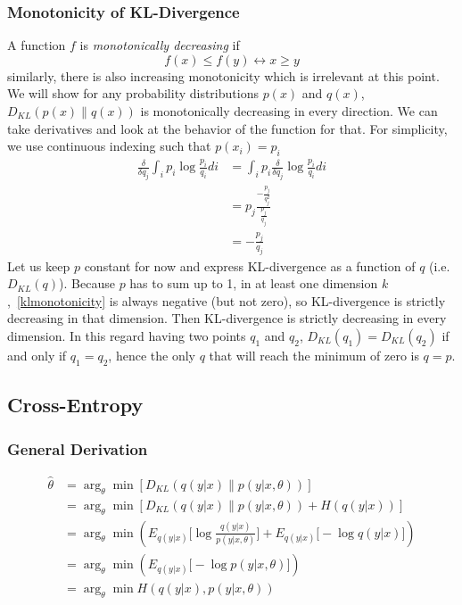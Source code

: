 \documentclass{book}
\numberwithin{equation}{subsection}
\begin{document}
\subsubsection{Monotonicity of KL-Divergence}
A function $f$ is \textit{monotonically decreasing} if
\begin{equation}
    f(x) \leq f(y) \longleftrightarrow x \geq y
\end{equation}
similarly, there is also increasing monotonicity which is irrelevant at this point. We will show for any probability distributions $p(x)$ and $q(x)$, $D_{KL}(p(x)\parallel q(x))$ is monotonically decreasing in every direction. We can take derivatives and look at the behavior of the function for that. For simplicity, we use continuous indexing such that $p(x_i)=p_i$
\begin{align}
    \frac{\delta}{\delta q_j}\int_i p_i\log\frac{p_i}{q_i} di &= \int_i p_i\frac{\delta}{\delta q_j}\log\frac{p_i}{q_i} di\\
    &= p_j\frac{-\frac{p_j}{q_j^2}}{\frac{p_j}{q_j}}\\
    &= -\frac{p_j}{q_j} \label{klmonotonicity}
\end{align}
Let us keep $p$ constant for now and express KL-divergence as a function of $q$ (i.e. $D_{KL}(q)$). Because $p$ has to sum up to 1, in at least one dimension $k$,~\ref{klmonotonicity} is always negative (but not zero), so KL-divergence is strictly decreasing in that dimension. Then KL-divergence is strictly decreasing in every dimension. In this regard having two points $q_1$ and $q_2$, $D_{KL}(q_1)=D_{KL}(q_2)$ if and only if $q_1=q_2$, hence the only $q$ that will reach the minimum of zero is $q=p$.
\subsection{Cross-Entropy}
\subsubsection{General Derivation}
\begin{align}
    \hat{\theta}
    &= \arg_\theta \min[D_{KL}(q(y|x) \parallel p(y|x,\theta))]\\
    &= \arg_\theta \min[ D_{KL}(q(y|x) \parallel p(y|x,\theta)) + H(q(y|x))]\\
    &= \arg_\theta \min \left( E_{q(y|x)}\Big[\log\frac{q(y|x)}{p(y|x,\theta)}\Big] + E_{q(y|x)}\Big[-\log q(y|x)\Big]\right)\\
    &= \arg_\theta \min \left( E_{q(y|x)}\Big[-\log p(y|x,\theta)\Big]\right)\label{ce_derivation_res}\\
    &= \arg_\theta \min H(q(y|x), p(y|x,\theta))
\end{align}
\end{document}
